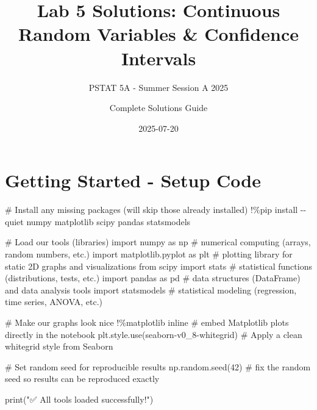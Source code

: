 \documentclass[
  letterpaper,
  DIV=11,
  numbers=noendperiod]{scrartcl}
\title{Lab 5 Solutions: Continuous Random Variables \& Confidence
Intervals}
\subtitle{PSTAT 5A - Summer Session A 2025}
\author{Complete Solutions Guide}
\date{2025-07-20}
\newenvironment{Shaded}{\begin{snugshade}}{\end{snugshade}}
\newcommand{\BuiltInTok}[1]{\textcolor[rgb]{0.00,0.23,0.31}{#1}}
\newcommand{\CommentTok}[1]{\textcolor[rgb]{0.37,0.37,0.37}{#1}}
\newcommand{\DecValTok}[1]{\textcolor[rgb]{0.68,0.00,0.00}{#1}}
\newcommand{\ImportTok}[1]{\textcolor[rgb]{0.00,0.46,0.62}{#1}}
\newcommand{\NormalTok}[1]{\textcolor[rgb]{0.00,0.23,0.31}{#1}}
\newcommand{\OperatorTok}[1]{\textcolor[rgb]{0.37,0.37,0.37}{#1}}
\newcommand{\StringTok}[1]{\textcolor[rgb]{0.13,0.47,0.30}{#1}}
\renewcommand*\contentsname{Table of contents}
\newcommand\contentsname{Table of contents}
\begin{document}
\maketitle

\renewcommand*\contentsname{Table of contents}
{
\hypersetup{linkcolor=}
\setcounter{tocdepth}{3}
\tableofcontents
}

\section{Getting Started - Setup
Code}\label{getting-started---setup-code}

\begin{Shaded}
\begin{Highlighting}[]
\CommentTok{\# Install any missing packages (will skip those already installed)}
\OperatorTok{!\%}\NormalTok{pip install }\OperatorTok{{-}{-}}\NormalTok{quiet numpy matplotlib scipy pandas statsmodels}

\CommentTok{\# Load our tools (libraries)}
\ImportTok{import}\NormalTok{ numpy }\ImportTok{as}\NormalTok{ np }\CommentTok{\# numerical computing (arrays, random numbers, etc.)}
\ImportTok{import}\NormalTok{ matplotlib.pyplot }\ImportTok{as}\NormalTok{ plt }\CommentTok{\# plotting library for static 2D graphs and visualizations}
\ImportTok{from}\NormalTok{ scipy }\ImportTok{import}\NormalTok{ stats }\CommentTok{\#  statistical functions (distributions, tests, etc.)}
\ImportTok{import}\NormalTok{ pandas }\ImportTok{as}\NormalTok{ pd }\CommentTok{\# data structures (DataFrame) and data analysis tools}
\ImportTok{import}\NormalTok{ statsmodels  }\CommentTok{\# statistical modeling (regression, time series, ANOVA, etc.)}

\CommentTok{\# Make our graphs look nice}
\OperatorTok{!\%}\NormalTok{matplotlib inline     }\CommentTok{\# embed Matplotlib plots directly in the notebook}
\NormalTok{plt.style.use(}\StringTok{\textquotesingle{}seaborn{-}v0\_8{-}whitegrid\textquotesingle{}}\NormalTok{)  }\CommentTok{\# Apply a clean whitegrid style from Seaborn}

\CommentTok{\# Set random seed for reproducible results}
\NormalTok{np.random.seed(}\DecValTok{42}\NormalTok{)    }\CommentTok{\# fix the random seed so results can be reproduced exactly}

\BuiltInTok{print}\NormalTok{(}\StringTok{"✅ All tools loaded successfully!"}\NormalTok{) }
\end{Highlighting}
\end{Shaded}
\end{document}
